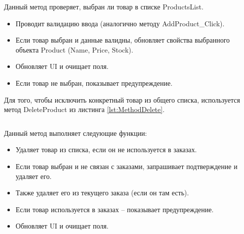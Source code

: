 \documentclass[12pt]{article}
\newcommand{\colorGIT}[1]{\textcolor{CtpLavender}{#1}}
\renewcommand{\texttt}[1]{{\small\ttfamily #1}}
\newenvironment{code}
  {\par\captionsetup{type=listing}\noindent}
  {\par\vspace{\baselineskip}}
\numberwithin{listing}{section}
\numberwithin{figure}{section}
\begin{document}
\noindent Данный метод проверяет, выбран ли товар в списке \texttt{ProductsList}.
\begin{itemize}
	\item Проводит валидацию ввода (аналогично методу \texttt{AddProduct\_Click}).
	\item Если товар выбран и данные валидны, обновляет свойства выбранного объекта \texttt{Product} (\texttt{Name}, \texttt{Price}, \texttt{Stock}).
	\item Обновляет \texttt{UI} и очищает поля.
	\item Если товар не выбран, показывает предупреждение.
\end{itemize}

Для того, чтобы исключить конкретный товар из общего списка, используется метод \texttt{Delete\-Product} из листинга \ref{lst:MethodDelete}.


\begin{code}
	\inputminted[firstline=112, lastline=141]{csharp}{../3lab/StoreManager/MainWindow.xaml.cs}
	\caption{\colorGIT{\href{https://github.com/WebMasterIT/Csharp_Labs/blob/ec375afd16c0647b337cf3d8a79c8bef904fc1be/3lab/StoreManager/MainWindow.xaml.cs\#L112-L141}{Метод}} удаления товара}
	\label{lst:MethodDelete}
\end{code}

\noindent Данный метод выполняет следующие функции:
\begin{itemize}
	\item Удаляет товар из списка, если он не используется в заказах.
	\item Если товар выбран и не связан с заказами, запрашивает подтверждение и удаляет его.
	\item Также удаляет его из текущего заказа (если он там есть).
	\item Если товар используется в заказах -- показывает предупреждение.
	\item Обновляет \texttt{UI} и очищает поля.
\end{itemize}


\begin{code}
	\inputminted[firstline=143, lastline=184]{csharp}{../3lab/StoreManager/MainWindow.xaml.cs}
	\caption{\colorGIT{\href{https://github.com/WebMasterIT/Csharp_Labs/blob/ec375afd16c0647b337cf3d8a79c8bef904fc1be/3lab/StoreManager/MainWindow.xaml.cs\#L143-L184}{Методы}} редактирования товара и добавления в список выбранных товаров для заказа}
	\label{lst:MethodEdit}
\end{code}
\end{document}
